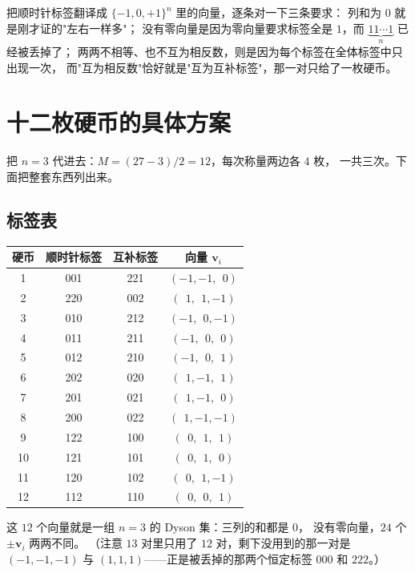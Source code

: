 \documentclass[UTF8,11pt,fontset=macnew]{ctexart}
\newcommand{\vv}{\mathbf{v}}
\begin{document}
\begin{keybox}
把顺时针标签翻译成 $\{-1,0,+1\}^n$ 里的向量，逐条对一下三条要求：
列和为 $0$ 就是刚才证的"左右一样多"；
没有零向量是因为零向量要求标签全是 $1$，而 $\underbrace{11\cdots1}_{n}$ 已经被丢掉了；
两两不相等、也不互为相反数，则是因为每个标签在全体标签中只出现一次，
而"互为相反数"恰好就是"互为互补标签"，那一对只给了一枚硬币。
\end{keybox}

\section{十二枚硬币的具体方案}

把 $n=3$ 代进去：$M=(27-3)/2=12$，每次称量两边各 $4$ 枚，
一共三次。下面把整套东西列出来。

\subsection{标签表}

\begin{center}
\begin{tabular}{c c c c}
\toprule
硬币 & 顺时针标签 & 互补标签 & 向量 $\vv_i$ \\
\midrule
1  & 001 & 221 & $(-1,-1,\ \ 0)$ \\
2  & 220 & 002 & $(\ \ 1,\ \ 1,-1)$ \\
3  & 010 & 212 & $(-1,\ \ 0,-1)$ \\
4  & 011 & 211 & $(-1,\ \ 0,\ \ 0)$ \\
5  & 012 & 210 & $(-1,\ \ 0,\ \ 1)$ \\
6  & 202 & 020 & $(\ \ 1,-1,\ \ 1)$ \\
7  & 201 & 021 & $(\ \ 1,-1,\ \ 0)$ \\
8  & 200 & 022 & $(\ \ 1,-1,-1)$ \\
9  & 122 & 100 & $(\ \ 0,\ \ 1,\ \ 1)$ \\
10 & 121 & 101 & $(\ \ 0,\ \ 1,\ \ 0)$ \\
11 & 120 & 102 & $(\ \ 0,\ \ 1,-1)$ \\
12 & 112 & 110 & $(\ \ 0,\ \ 0,\ \ 1)$ \\
\bottomrule
\end{tabular}
\end{center}

这 $12$ 个向量就是一组 $n=3$ 的 Dyson 集：三列的和都是 $0$，
没有零向量，$24$ 个 $\pm\vv_i$ 两两不同。
（注意 $13$ 对里只用了 $12$ 对，剩下没用到的那一对是
$(-1,-1,-1)$ 与 $(1,1,1)$——正是被丢掉的那两个恒定标签 $000$ 和 $222$。）
\end{document}
